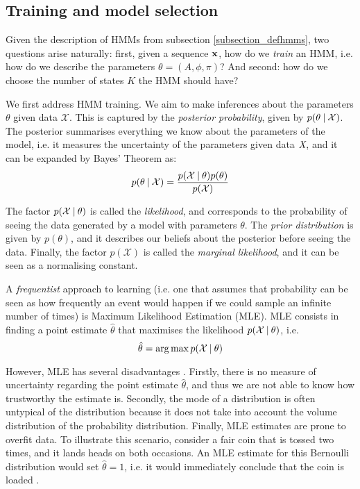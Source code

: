 \documentclass[../main.tex]{subfiles}
\begin{document}
\subsection{Training and model selection} \label{subsection_model}
Given the description of HMMs from subsection \ref{subsection_defhmms}, two questions arise naturally: first, given a sequence $\mathbf{x}$, how do we \emph{train} an HMM, i.e. how do we describe the parameters $\theta = (A, \phi, \pi)$? And second: how do we choose the number of states $K$ the HMM should have?
\par We first address HMM training. We aim to make inferences about the parameters $\theta$ given data $\mathcal{X}$. This is captured by the \emph{posterior probability}, given by $p(\theta \:\vert\: \mathcal{X})$. The posterior summarises everything we know about the parameters of the model, i.e. it measures the uncertainty of the parameters given data $\emph{X}$, and it can be expanded by Bayes' Theorem as:
\begin{equation}\label{eq:bayes_posterior}
p(\theta \:\vert\: \mathcal{X}) = \frac{p(\mathcal{X} \:\vert\: \theta)p(\theta)}{p(\mathcal{X})}
\end{equation}
\par The factor $p(\mathcal{X} \:\vert\: \theta)$ is called the \emph{likelihood}, and corresponds to the probability of seeing the data generated by a model with parameters $\theta$. The \emph{prior distribution} is given by $p(\theta)$, and it describes our beliefs about the posterior before seeing the data. Finally, the factor $p(\mathcal{X})$ is called the \emph{marginal likelihood}, and it can be seen as a normalising constant. 
\par A \emph{frequentist} approach to learning (i.e. one that assumes that probability can be seen as how frequently an event would happen if we could sample an infinite number of times) is Maximum Likelihood Estimation (MLE). MLE consists in finding a point estimate $\hat{\theta}$ that maximises the likelihood $p(\mathcal{X} \:\vert\: \theta)$, i.e.
\begin{equation}
\hat{\theta} = \operatorname*{arg\,max}{p(\mathcal{X} \:\vert\: \theta)}
\end{equation}
\par However, MLE has several disadvantages \cite{Murphy2012}. Firstly, there is no measure of uncertainty regarding the point estimate $\hat{\theta}$, and thus we are not able to know how trustworthy the estimate is. Secondly, the mode of a distribution is often untypical of the distribution \cite{Murphy2012} because it does not take into account the volume distribution of the probability distribution. Finally, MLE estimates are prone to overfit data. To illustrate this scenario, consider a fair coin that is tossed two times, and it lands heads on both occasions. An MLE estimate for this Bernoulli distribution would set $\hat{\theta} = 1$, i.e. it would immediately conclude that the coin is loaded \cite{Murphy2012}.
\end{document}
